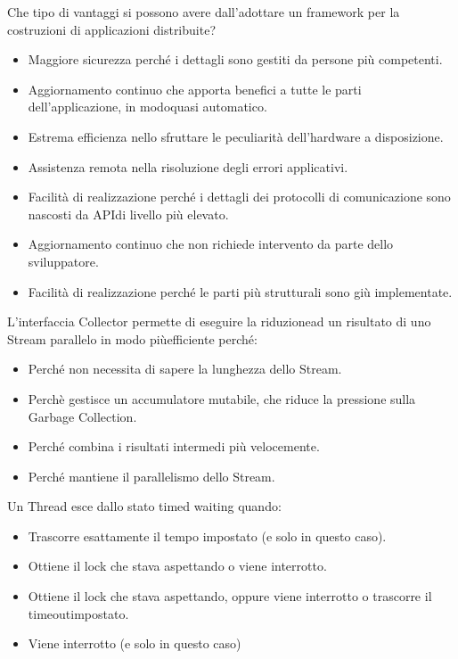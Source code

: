 \documentclass{article}
\begin{document}
Che tipo di vantaggi si possono avere dall'adottare un framework per la costruzioni di applicazioni distribuite?
\begin{itemize}
	\item \checkmark Maggiore sicurezza perché i dettagli sono gestiti da persone più competenti.
	\item \checkmark Aggiornamento continuo che apporta benefici a tutte le parti dell'applicazione, in modoquasi automatico.
	\item Estrema efficienza nello sfruttare le peculiarità dell'hardware a disposizione.
	\item Assistenza remota nella risoluzione degli errori applicativi.
	\item \checkmark Facilità di realizzazione perché i dettagli dei protocolli di comunicazione sono nascosti da APIdi livello più elevato.
	\item Aggiornamento continuo che non richiede intervento da parte dello sviluppatore.
	\item \checkmark Facilità di realizzazione perché le parti più strutturali sono giù implementate.
\end{itemize}

L'interfaccia Collector permette di eseguire la riduzionead un risultato di uno Stream parallelo in modo piùefficiente perché:
\begin{itemize}
	\item Perché non necessita di sapere la lunghezza dello Stream.
	\item \checkmark Perchè gestisce un accumulatore mutabile, che riduce la pressione sulla Garbage Collection.
	\item Perché combina i risultati intermedi più velocemente.
	\item Perché mantiene il parallelismo dello Stream.
\end{itemize}

Un Thread esce dallo stato timed waiting quando:

\begin{itemize}
\item Trascorre esattamente il tempo impostato (e solo in questo caso).
\item Ottiene il lock che stava aspettando o viene interrotto.
\item \checkmark Ottiene il lock che stava aspettando, oppure viene interrotto o trascorre il timeoutimpostato.
\item Viene interrotto (e solo in questo caso)
\end{itemize}
\end{document}
